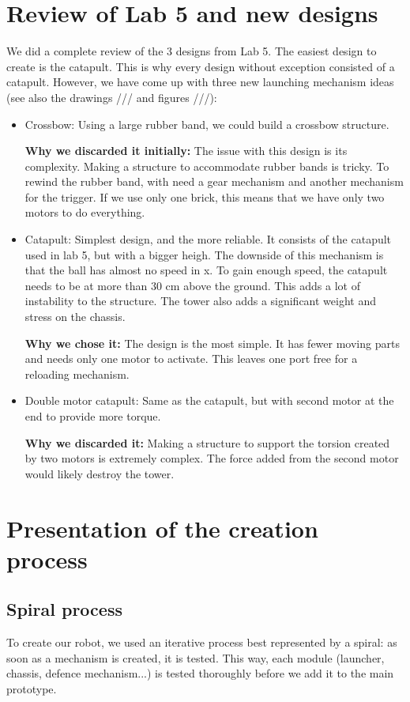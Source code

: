 \documentclass[]{article}
\begin{document}
\section{Review of Lab 5 and new designs}
We did a complete review of the 3 designs from Lab 5.  The easiest design to create is the catapult.  This is why every design without exception consisted of a catapult.  However, we have come up with three new launching mechanism ideas (see also the drawings /// and figures ///):
\begin{itemize}
\item Crossbow: Using a large rubber band, we could build a crossbow structure. 
 
\textbf{Why we discarded it initially:}  The issue with this design is its complexity. Making a structure to accommodate rubber bands is tricky.  To rewind the rubber band, with need a gear mechanism and another mechanism for the trigger.  If we use only one brick, this means that we have only two motors to do everything.  
\item Catapult: Simplest design, and the more reliable.  It consists of the catapult used in lab 5, but with a bigger heigh.  The downside of this mechanism is that the ball has almost no speed in x.  To gain enough speed, the catapult needs to be at more than 30 cm above the ground.  This adds a lot of instability to the structure.  The tower also adds a significant weight and stress on the chassis.
 
\textbf{Why we chose it:} The design is the most simple.  It has fewer moving parts and needs only one motor to activate.  This leaves one port free for a reloading mechanism.
\item Double motor catapult: Same as the catapult, but with second motor at the end to provide more torque.

\textbf{Why we discarded it:} Making a structure to support the torsion created by two motors is extremely complex.  The force added from the second motor would likely destroy the tower.
\end{itemize}


\newpage
\section{Presentation of the creation process}
\subsection{Spiral process}
To create our robot, we used an iterative process best represented by a spiral: as soon as a mechanism is created, it is tested.  This way, each module (launcher, chassis, defence mechanism...) is tested thoroughly before we add it to the main prototype.
\end{document}
